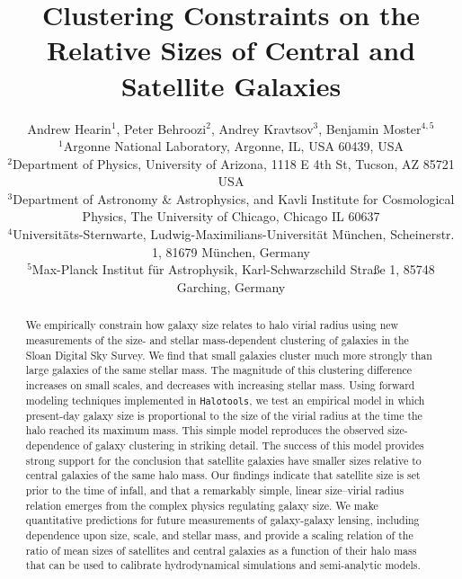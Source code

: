 \documentclass[usenatbib,usegraphicx,letterpaper]{mn2e}
\begin{document}
\title[The Relative Sizes of Centrals and Satellites]
{Clustering Constraints on the Relative Sizes of Central and Satellite Galaxies}


\author[Hearin, Behroozi, Kravtsov \& Moster]{
Andrew Hearin$^{1}$, Peter Behroozi$^{2}$, Andrey Kravtsov$^{3}$, Benjamin Moster$^{4,5}$\\
$^{1}$Argonne National Laboratory, Argonne, IL, USA 60439, USA\\
$^{2}$Department of Physics, University of Arizona, 1118 E 4th St, Tucson, AZ 85721 USA\\
$^{3}$Department of Astronomy \& Astrophysics, and Kavli Institute for Cosmological Physics, The University of Chicago, Chicago IL 60637\\
$^{4}$Universit{\"a}ts-Sternwarte, Ludwig-Maximilians-Universit{\"a}t M{\"u}nchen, Scheinerstr. 1, 81679 M{\"u}nchen, Germany\\
$^5$Max-Planck Institut f\"ur Astrophysik, Karl-Schwarzschild Stra\ss e 1, 85748 Garching, Germany
}

\maketitle

\begin{abstract}
We empirically constrain how galaxy size relates to halo virial radius using new measurements of the size- and stellar mass-dependent clustering of galaxies in the Sloan Digital Sky Survey.  We find that small galaxies cluster much more strongly than large galaxies of the same stellar mass.
The magnitude of this clustering difference increases on small scales, and decreases with increasing stellar mass.
Using forward modeling techniques implemented in {\tt Halotools}, we test an empirical model in which present-day galaxy size is
proportional to the size of the virial radius at the time the halo reached its maximum mass. This simple model reproduces the
observed size-dependence of galaxy clustering in striking detail.
The success of this model provides strong support for the conclusion that satellite galaxies have smaller sizes relative to central
galaxies of the same halo mass.
Our findings indicate that satellite size is set prior to the time of infall, and that a remarkably simple, linear size--virial radius relation
emerges from the complex physics regulating galaxy size.
We make quantitative predictions for future measurements of galaxy-galaxy lensing, including dependence upon size, scale,
and stellar mass, and provide a scaling relation of the ratio of mean sizes of satellites and central galaxies as a function of their halo mass
that can be used to calibrate hydrodynamical simulations and semi-analytic models.
\end{abstract}
\end{document}
